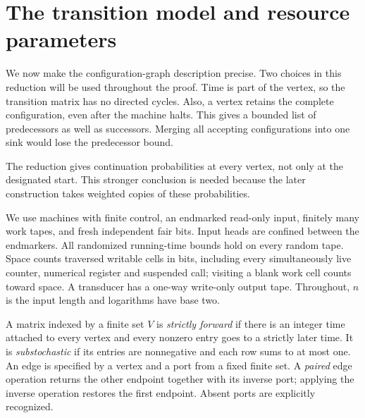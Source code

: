 \section{The transition model and resource parameters}\label{sec:model}

We now make the configuration-graph description precise. Two choices in this reduction will be used throughout the proof. Time is part of the vertex, so the transition matrix has no directed cycles. Also, a vertex retains the complete configuration, even after the machine halts. This gives a bounded list of predecessors as well as successors. Merging all accepting configurations into one sink would lose the predecessor bound.

The reduction gives continuation probabilities at every vertex, not only at the designated start. This stronger conclusion is needed because the later construction takes weighted copies of these probabilities.

We use machines with finite control, an endmarked read-only input,
finitely many work tapes, and fresh independent fair bits. Input heads
are confined between the endmarkers. All randomized running-time
bounds hold on every random tape. Space counts traversed writable cells
in bits, including every simultaneously live counter, numerical register
and suspended call; visiting a blank work cell counts toward space.
A transducer has a one-way write-only output tape. Throughout,
$n$ is the input length and logarithms have base two.


A matrix indexed by a finite set $V$ is \emph{strictly forward} if
there is an integer time attached to every vertex and every nonzero
entry goes to a strictly later time. It is \emph{substochastic} if its
entries are nonnegative and each row sums to at most one. An edge is
specified by a vertex and a port from a fixed finite set. A \emph{paired}
edge operation returns the other endpoint together with its inverse
port; applying the inverse operation restores the first endpoint.
Absent ports are explicitly recognized.

